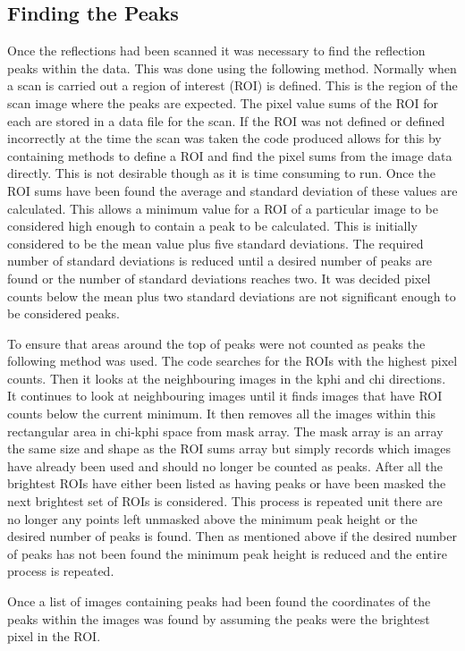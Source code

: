 \documentclass[10pt,a4paper]{article}
\begin{document}
\begin{multicols}{2}
\section*{Finding the Peaks}
Once the reflections had been scanned it was necessary to find the reflection peaks within the data. This was done using the following method. Normally when a scan is carried out a region of interest (ROI) is defined. This is the region of the scan image where the peaks are expected. The pixel value sums of the ROI for each are stored in a data file for the scan. If the ROI was not defined or defined incorrectly at the time the scan was taken the code produced allows for this by containing methods to define a ROI and find the pixel sums from the image data directly. This is not desirable though as it is time consuming to run. Once the ROI sums have been found the average and standard deviation of these values are calculated. This allows a minimum value for a ROI of a particular image to be considered high enough to contain a peak to be calculated. This is initially considered to be the mean value plus five standard deviations. The required number of standard deviations is reduced until a desired number of peaks are found or the number of standard deviations reaches two. It was decided pixel counts below the mean plus two standard deviations are not significant enough to be considered peaks.

To ensure that areas around the top of peaks were not counted as peaks the following method was used. The code searches for the ROIs with the highest pixel counts. Then it looks at the neighbouring images in the kphi and chi directions. It continues to look at neighbouring images until it finds images that have ROI counts below the current minimum. It then removes all the images within this rectangular area in chi-kphi space from mask array. The mask array is an array the same size and shape as the ROI sums array but simply records which images have already been used and should no longer be counted as peaks. After all the brightest ROIs have either been listed as having peaks or have been masked the next brightest set of ROIs is considered. This process is repeated unit there are no longer any points left unmasked above the minimum peak height or the desired number of peaks is found. Then as mentioned above if the desired number of peaks has not been found the minimum peak height is reduced and the entire process is repeated.  

Once a list of images containing peaks had been found the coordinates of the peaks within the images was found by assuming the peaks were the brightest pixel in the ROI.


\end{multicols}
\end{document}
